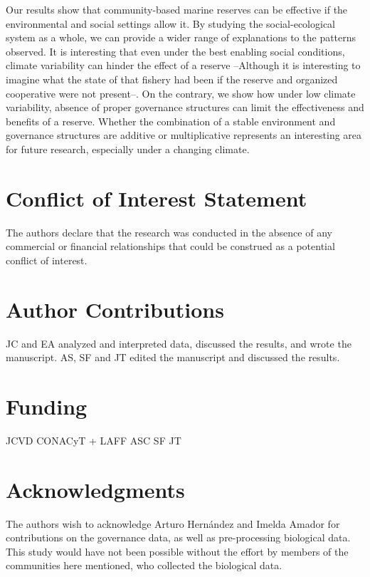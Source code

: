 \documentclass{frontiersSCNS}
\theoremstyle{definition}
\theoremstyle{definition}
\theoremstyle{definition}
\theoremstyle{remark}
\begin{document}
Our results show that community-based marine reserves can be effective
if the environmental and social settings allow it. By studying the
social-ecological system as a whole, we can provide a wider range of
explanations to the patterns observed. It is interesting that even under
the best enabling social conditions, climate variability can hinder the
effect of a reserve --Although it is interesting to imagine what the
state of that fishery had been if the reserve and organized cooperative
were not present--. On the contrary, we show how under low climate
variability, absence of proper governance structures can limit the
effectiveness and benefits of a reserve. Whether the combination of a
stable environment and governance structures are additive or
multiplicative represents an interesting area for future research,
especially under a changing climate.

\section*{Conflict of Interest Statement}

The authors declare that the research was conducted in the absence of
any commercial or financial relationships that could be construed as a
potential conflict of interest.

\section*{Author Contributions}

JC and EA analyzed and interpreted data, discussed the results, and
wrote the manuscript. AS, SF and JT edited the manuscript and discussed
the results.

\section*{Funding}

JCVD CONACyT + LAFF ASC SF JT

\section*{Acknowledgments}

The authors wish to acknowledge Arturo Hernández and Imelda Amador for
contributions on the governance data, as well as pre-processing
biological data. This study would have not been possible without the
effort by members of the communities here mentioned, who collected the
biological data.
\end{document}
